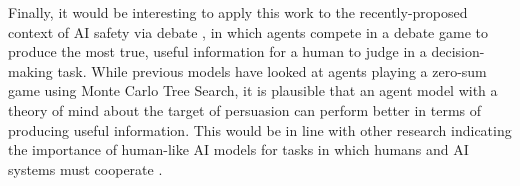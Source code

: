 \documentclass[10pt,letterpaper]{article}
\begin{document}
Finally, it would be interesting to apply this work to the recently-proposed context of AI safety via debate \cite{irving_ai_2018}, in which
agents compete in a debate game to produce the most true, useful information for a human to judge in a decision-making
task. While previous models have looked at agents playing a zero-sum game using Monte Carlo Tree Search, it is 
plausible that an agent model with a theory of mind about the target of persuasion can perform better in terms of producing
useful information. This would be in line with other research indicating the importance of human-like AI models for tasks in which
humans and AI systems must cooperate \cite{carroll2019utility, hilgard_learning_2019}.


\nocite{lawson-tancred_art_1991}



\setlength{\bibleftmargin}{.125in}
\setlength{\bibindent}{-\bibleftmargin}


\end{document}
